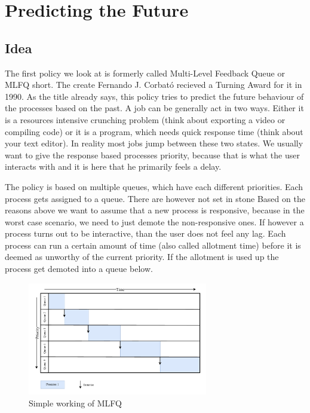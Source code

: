 \chapter{Predicting the Future}

\section{Idea}

The first policy we look at is formerly called Multi-Level Feedback Queue or MLFQ short. The create Fernando J. Corbató recieved a Turning Award for it in 1990. 
As the title already says, this policy tries to predict the future behaviour of the processes based on the past.
A job can be generally act in two ways.
Either it is a resources intensive crunching problem (think about exporting a video or compiling code) or it is a program, which needs quick response time (think about your text editor).
In reality most jobs jump between these two states.
We usually want to give the response based processes priority, because that is what the user interacts with and it is here that he primarily feels a delay.

The policy is based on multiple queues, which have each different priorities.
Each process gets assigned to a queue. There are however not set in stone
Based on the reasons above we want to assume that a new process is responsive, because in the worst case scenario, we need to just demote the non-responsive ones.
If however a process turns out to be interactive, than the user does not feel any lag. 
Each process can run a certain amount of time (also called allotment time) before it is deemed as unworthy of the current priority.
If the allotment is used up the process get demoted into a queue below.

\begin{figure}[h]
    \centering
    \includegraphics[width=0.7\textwidth]{Assets/MLFQ-Example-1.pdf}
    \caption{Simple working of MLFQ}
    \label{fig:mlfq-example-1}
\end{figure}


